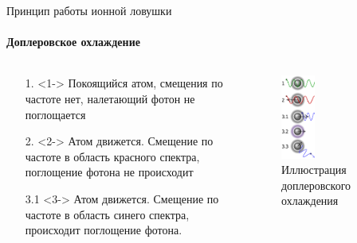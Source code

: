 \documentclass{beamer}
\begin{document}
    \begin{frame}{Принцип работы ионной ловушки}
    \framesubtitle{Доплеровское охлаждение}

        \begin{columns}

        \begin{column}{0.5\textwidth}

            \begin{itemize}
                \item[1.] <1-> Покоящийся атом, смещения по частоте нет, налетающий фотон
                               не поглощается
                \item[2.] <2-> Атом движется. Смещение по частоте в область красного спектра,
                               поглощение фотона не происходит
                \item[3.1] <3-> Атом движется. Смещение по частоте в область синего спектра,
                                происходит поглощение фотона.
            \end{itemize}

        \end{column}

        \begin{column}{0.5\textwidth}
            \begin{figure}
                \centering
                \includegraphics[width=0.35\textwidth]{media/dopler-cooling.png}
                \caption{Иллюстрация доплеровского охлаждения}
            \end{figure}
        \end{column}

        \end{columns}
    \end{frame}
\end{document}
